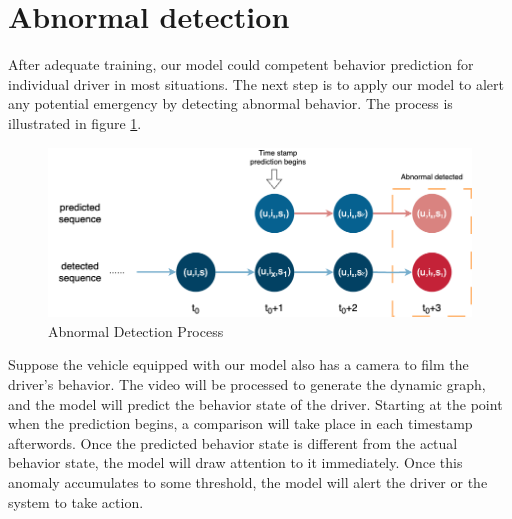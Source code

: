 \clearpage
\section{Abnormal detection}

After adequate training, our model could competent behavior prediction for individual driver in most situations. The next step is to apply our model to alert any potential emergency by detecting abnormal behavior. The process is illustrated in figure \ref{fig:anormal_detection}.
\begin{figure}[h]
    \centering
    \includegraphics[width=\linewidth]{figures/04_anormal_detection.png}
    \caption{Abnormal Detection Process}
    \label{fig:anormal_detection}
\end{figure}

Suppose the vehicle equipped with our model also has a camera to film the driver's behavior. The video will be processed to generate the dynamic graph, and the model will predict the behavior state of the driver.
Starting at the point when the prediction begins, a comparison will take place in each timestamp afterwords. Once the predicted behavior state is different from the actual behavior state, the model will draw attention to it immediately. Once this anomaly accumulates to some threshold, the model will alert the driver or the system to take action.
